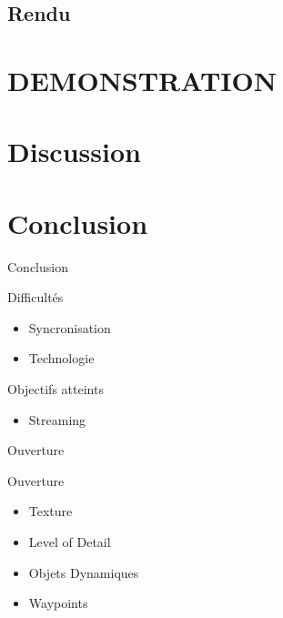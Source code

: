 \documentclass{beamer}
\begin{document}
		\subsection{Rendu}

	\section{DEMONSTRATION}

	\section{Discussion}
			
	
	

	\section{Conclusion}
		\begin{frame}{Conclusion}
			\begin{alertblock}{Difficultés}
				\begin{itemize}
					\item{Syncronisation}
					\item{Technologie}
				\end{itemize}
			\end{alertblock}
			\pause
			\begin{exampleblock}{Objectifs atteints}
				\begin{itemize}
					\item{Streaming}
				\end{itemize}
			\end{exampleblock}
		\end{frame}
		\begin{frame}{Ouverture}
			\begin{block}{Ouverture}
				\begin{itemize}
					\item Texture
					\item Level of Detail
					\item Objets Dynamiques
					\item Waypoints
				\end{itemize}
			\end{block}
		\end{frame}
	
\end{document}
